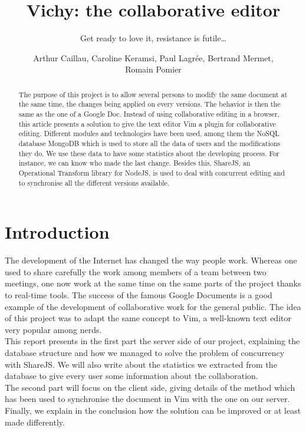 \documentclass{llncs}
\begin{document}
\title{Vichy: the collaborative editor}
\subtitle{Get ready to love it, resistance is futile\ldots}

\author{Arthur Caillau, Caroline Keramsi, Paul Lagrée, Bertrand Mermet,\\Romain Pomier}

\maketitle

\begin{abstract}

The purpose of this project is to allow several persons to modify the same
document at the same time, the changes being applied on every versions.
The behavior is then the same as the one of a Google Doc.
Instead of using collaborative editing in a browser, this article presents a
solution to give the text editor Vim a plugin for collaborative editing.
Different modules and technologies have been used, among them the NoSQL
database MongoDB which is used to store all the data of users and the
modifications they do.
We use these data to have some statistics about the developing process.
For instance, we can know who made the last change. Besides this, ShareJS, an
Operational Transform library for NodeJS, is used to deal with concurrent
editing and to synchronise all the different versions available.

\end{abstract}

\section{Introduction}\label{sec:Introduction}

The development of the Internet has changed the way people work.
Whereas one used to share carefully the work among members of a team between
two meetings, one now work at the same time on the same parts of the project
thanks to real-time tools.
The success of the famous Google Documents is a good example of the development
of collaborative work for the general public.
The idea of this project was to adapt the same concept to Vim, a well-known
text editor very popular among nerds.\\
This report presents in the first part the server side of our project, explaining
the database structure and how we managed to solve the problem of concurrency with ShareJS.
We will also write about the statistics we extracted from the database to give
every user some information about the collaboration.\\
The second part will focus on the client side, giving details of the method
which has been used to synchronise the document in Vim with the one on our server.\\
Finally, we explain in the conclusion how the solution can be improved or at
least made differently.
\end{document}
